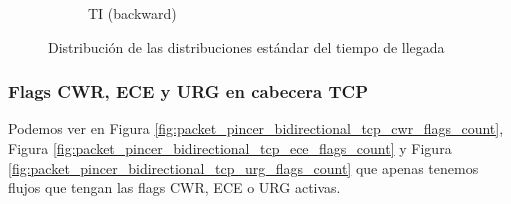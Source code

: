 \begin{figure}[H]
\begin{subfigure}[b]{0.26\textwidth}
        \caption{TI (backward)}
    \end{subfigure}
    \hfill
       \caption{Distribución de las distribuciones estándar del tiempo de llegada}
       \label{fig:packet_pincer_inter_arrival_time_std}
\end{figure}

\subsubsection{Flags CWR, ECE y URG en cabecera TCP}

Podemos ver en Figura \ref{fig:packet_pincer_bidirectional_tcp_cwr_flags_count}, Figura \ref{fig:packet_pincer_bidirectional_tcp_ece_flags_count} y Figura \ref{fig:packet_pincer_bidirectional_tcp_urg_flags_count} que apenas tenemos flujos que tengan las flags CWR, ECE o URG activas.

